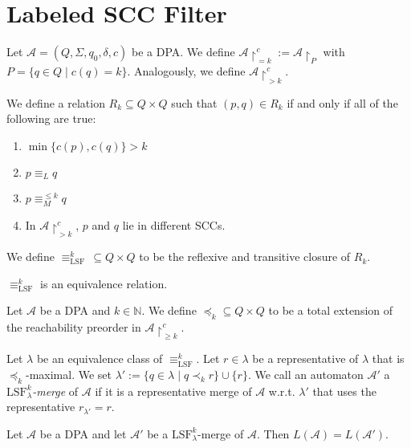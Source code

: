 \section{Labeled SCC Filter}
\begin{defn}
	Let $\mathcal{A} = (Q, \Sigma, q_0, \delta, c)$ be a DPA. We define $\mathcal{A}\upharpoonright^c_{= k} := \mathcal{A}\upharpoonright_P$ with $P = \{q \in Q \mid c(q) = k\}$. Analogously, we define $\mathcal{A}\upharpoonright^c_{> k}$.
	
	We define a relation $R_k \subseteq Q \times Q$ such that $(p, q) \in R_k$ if and only if all of the following are true:
	\begin{enumerate}
		\item $\min \{c(p), c(q)\} > k$
		\item $p \equiv_L q$
		\item $p \equiv_M^{\leq k} q$
		\item In $\mathcal{A}\upharpoonright^c_{> k}$, $p$ and $q$ lie in different SCCs.
	\end{enumerate}
	
	We define $\equiv_\text{LSF}^k \,\subseteq Q \times Q$ to be the reflexive and transitive closure of $R_k$.
\end{defn}

\begin{lem}
	$\equiv_\text{LSF}^k$ is an equivalence relation.
\end{lem}

\begin{defn}
	Let $\mathcal{A}$ be a DPA and $k \in \mathbb{N}$. We define $\preceq_k \subseteq Q \times Q$ to be a total extension of the reachability preorder in $\mathcal{A}\upharpoonright^c_{\geq k}$.
	
	Let $\lambda$ be an equivalence class of $\equiv_\text{LSF}^k$. Let $r \in \lambda$ be a representative of $\lambda$ that is $\preceq_k$-maximal. We set $\lambda' := \{q \in \lambda \mid q \prec_k r\} \cup \{r\}$. We call an automaton $\mathcal{A}'$ a \emph{$\text{LSF}_\lambda^k$-merge} of $\mathcal{A}$ if it is a representative merge of $\mathcal{A}$ w.r.t. $\lambda'$ that uses the representative $r_{\lambda'} = r$.
\end{defn}

\begin{theorem}
	Let $\mathcal{A}$ be a DPA and let $\mathcal{A}'$ be a $\text{LSF}_\lambda^k$-merge of $\mathcal{A}$. Then $L(\mathcal{A}) = L(\mathcal{A}')$.
	\label{thm:lsf:correctness}
\end{theorem}

